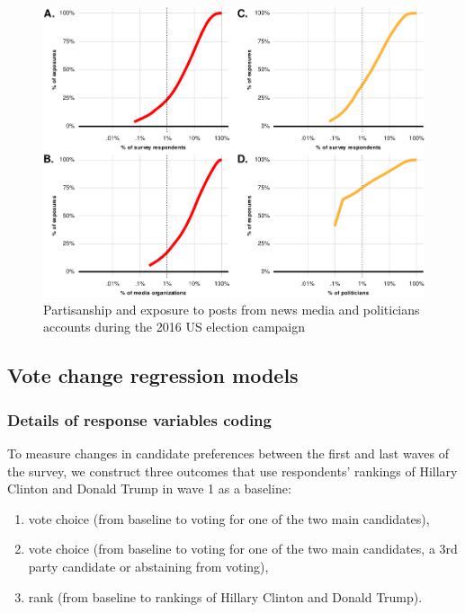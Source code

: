 \documentclass[
  12pt,
]{article}
\begin{document}
\begin{figure}
\centering
\includegraphics{Supplementary_Information_files/figure-latex/Supplementary-Figure-D7-1.pdf}
\caption{\label{fig:Supplementary-Figure-D7}Partisanship and exposure to posts from news media and politicians accounts during the 2016 US election campaign}
\end{figure}

\clearpage

\hypertarget{vote-change-regression-models}{%
\subsection{Vote change regression models}\label{vote-change-regression-models}}

\hypertarget{details-of-response-variables-coding}{%
\subsubsection{Details of response variables coding}\label{details-of-response-variables-coding}}

To measure changes in candidate preferences between the first and last waves of the survey, we construct three outcomes that use respondents' rankings of Hillary Clinton and Donald Trump in wave 1 as a baseline:

\begin{enumerate}[label=(\arabic*)]
  \item vote choice (from baseline to voting for one of the two main candidates),
  \item vote choice (from baseline to voting for one of the two main candidates, a 3rd party candidate or abstaining from voting),
  \item rank (from baseline to rankings of Hillary Clinton and Donald Trump).
\end{enumerate}
\end{document}
